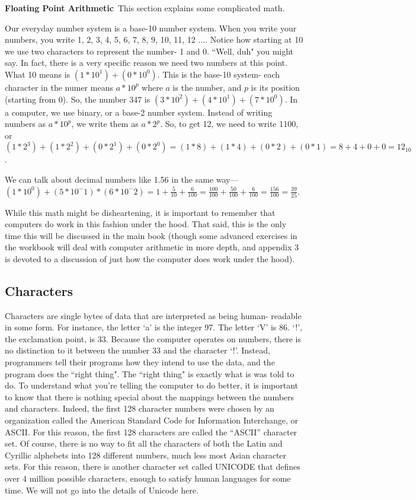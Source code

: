 {\bf Floating Point Arithmetic}\
This section explains some complicated math.\

Our everyday number system is a base-10 number system. When you write your
numbers, you write 1, 2, 3, 4, 5, 6, 7, 8, 9, 10, 11, 12 $...$. Notice how
starting at 10 we use two characters to represent the number- 1 and 0. ``Well,
duh" you might say. In fact, there is a very specific reason we need two
numbers at this point. What 10 means is $(1 * 10^1) + (0 * 10^0)$. This is the
base-10 system- each character in the numer means $a * 10 ^ p$ where $a$ is
the number, and $p$ is its position (starting from 0). So, the number 347 is
$(3 * 10 ^ 2) + (4 * 10 ^ 1) + (7 * 10^0)$. In a computer, we use binary, or a
base-2 number  system. Instead of writing numbers as $a * 10^p$, we write them
as $a * 2 ^ p$. So, to get 12, we need to write 1100, or $(1 * 2 ^ 3) + (1 *
2^2) + (0*2^1) + (0 * 2 ^ 0) = (1 * 8) + (1 * 4) + (0 * 2) + (0 * 1) = 8 + 4 +
0 + 0 = 12_10$.

We can talk about decimal numbers like 1.56 in the same way--- $(1 * 10 ^ 0) +
(5 * 10 ^ -1) * (6 * 10 ^ -2) = 1 + \frac{5}{10} + \frac{6}{100} =
\frac{100}{100} + \frac{50}{100} + \frac{6}{100} = \frac{156}{100} =
\frac{39}{25}$.

While this math might be disheartening, it is important to remember that
computers do work in this fashion under the hood. That said, this is the only
time this will be discussed in the main book (though some advanced exercises
in the workbook will deal with computer arithmetic in more depth, and appendix
3 is devoted to a discussion of just how the computer does work under the
hood).

\subsection{Characters}

Characters are single bytes of data that are interpreted as being human-
readable in some form. For instance, the letter `a' is the integer 97. The
letter `V' is 86. `!', the exclamation point, is 33. Because the computer
operates on numbers, there is no distinction to it between the number 33 and
the character `!'. Instead, programmers tell their programs how they intend to
use the data, and the program does the ``right thing". The ``right thing" is
exactly what is was told to do. To understand what you're telling the computer
to do better, it is important to know that there is nothing special about the
mappings between the numbers and characters. Indeed, the first 128 character
numbers were chosen by an organization called the American Standard Code for
Information Interchange, or ASCII. For this reason, the first 128 characters
are called the ``ASCII'' character set. Of course, there is no way to fit all
the characters of both the Latin and Cyrillic alphebets into 128 different
numbers, much less most Asian character sets. For this reason, there is
another character set called UNICODE that defines over 4 million possible
characters, enough to satisfy human languages for some time. We will not go
into the details of Unicode here.

